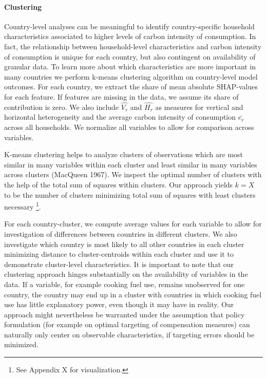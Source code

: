 \documentclass[12pt, a4paper]{article}
\begin{document}
\paragraph{Clustering} Country-level analyses can be meaningful to identify country-specific household characteristics associated to higher levels of carbon intensity of consumption. In fact, the relationship between household-level characteristics and carbon intensity of consumption is unique for each country, but also contingent on availability of granular data. To learn more about which characteristics are more important in many countries we perform k-means clustering algorithm on country-level model outcomes. For each country, we extract the share of mean absolute SHAP-values for each feature. If features are missing in the data, we assume its share of contribution is zero. We also include $\widehat{V_{r}}$ and $\widehat{H_{r}}$ as measures for vertical and horizontal heterogeneity and the average carbon intensity of consumption $\overline{e_{r}}$ across all households. We normalize all variables to allow for comparison across variables.

K-means clustering helps to analyze clusters of observations which are most similar in many variables within each cluster and least similar in many variables across clusters (MacQueen 1967). We inspect the optimal number of clusters with the help of the total sum of squares within clusters. Our approach yields $k = X$ to be the number of clusters minimizing total sum of squares with least clusters necessary \footnote{See Appendix X for visualization.}.

For each country-cluster, we compute average values for each variable to allow for investigation of differences between countries in different clusters. We also investigate which country is most likely to all other countries in each cluster minimizing distance to cluster-centroids within each cluster and use it to demonstrate cluster-level characteristics. It is important to note that our clustering approach hinges substantially on the availability of variables in the data. If a variable, for example cooking fuel use, remains unobserved for one country, the country may end up in a cluster with countries in which cooking fuel use has little explanatory power, even though it may have in reality. Our approach might nevertheless be warranted under the assumption that policy formulation (for example on optimal targeting of compensation measures) can naturally only center on observable characteristics, if targeting errors should be minimized. 
\end{document}
